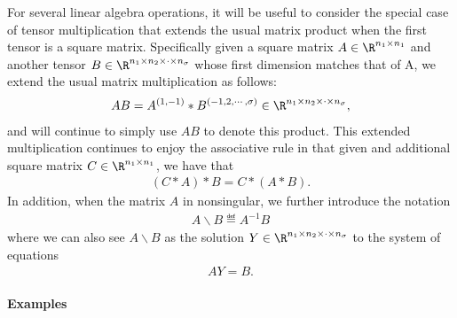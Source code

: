 \documentclass[11pt]{article}
\theoremstyle{remark}
\begin{document}
\medskip

For several linear algebra operations, it will be useful to consider
the special case of tensor multiplication that extends the usual
matrix product when the first tensor is a square matrix. Specifically
given a square matrix $A\in\R^{n_1\times n_1}$ and another tensor
$B\in\R^{n_1\times n_2\times\cdot\times n_\sigma}$ whose first dimension matches that of A, we
extend the usual matrix multiplication as follows:
\begin{align}\label{eq:generalized-product}
  AB=A^{(1,-1)} * B^{(-1,2,\cdots,\sigma)} \in\R^{n_1\times n_2\times\cdot\times n_\sigma},
\end{align}
and will continue to simply use $AB$ to denote this product.  This
extended multiplication continues to enjoy the associative rule in
that given and additional square matrix $C\in\R^{n_1\times n_1}$, we have that
\begin{align*}
  (C*A)*B=C*(A*B).
\end{align*}
In addition, when the matrix $A$ in nonsingular, we further introduce
the notation
\begin{align*}
  A\backslash B \eqdef A^{-1} B 
\end{align*}
where we can also see $A\backslash B$ as the solution
$Y\in\R^{n_1\times n_2\times\cdot\times n_\sigma}$ to the system of equations
\begin{align*}
  A Y=B.
\end{align*}


\paragraph{Examples}
\end{document}
